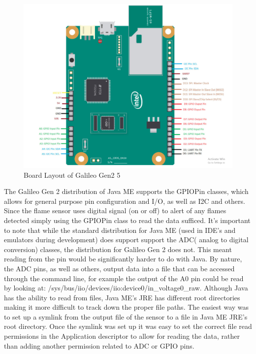  \begin{figure}[t]
	\centering
	\includegraphics[width=14cm,height=0.7\textheight,keepaspectratio]{./figures/figure_9}
	\center\caption[font=footnote]{Board Layout of Galileo Gen2 5}
\end{figure}

The Galileo Gen 2 distribution of Java ME supports the GPIOPin classes, which allows for general purpose pin configuration and I/O, as well as I2C and others. Since the flame sensor uses digital signal (on or off) to alert of any flames detected  simply using the GPIOPin class to read the data sufficed.  It's important to note that while the standard distribution for Java ME (used in IDE's and emulators during development) does support support the ADC( analog to digital conversion) classes, the distribution for Galileo Gen 2 does not. This meant reading from the pin would be significantly harder to do with Java. By nature, the ADC pins, as well as others, output data into a file that can be accessed through the command line, for example the output of the A0 pin could be read by looking at:  /sys/bus/iio/devices/iio:device0/in\_voltage0\_raw. Although Java has the ability to read from files, Java ME's JRE has different root directories making it more difficult to track down the proper file paths. The easiest way was to set up a symlink from the output file of the sensor to a file in Java ME JRE's root directory. Once the symlink was set up it was easy to set the correct file read permissions in the Application descriptor to allow for reading the data, rather than adding another permission related to ADC or GPIO pins.

